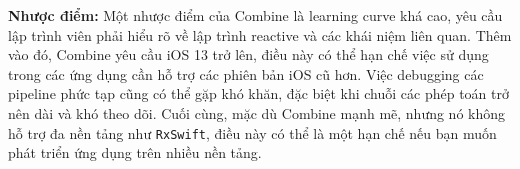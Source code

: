 \textbf{Nhược điểm:} Một nhược điểm của Combine là learning curve khá cao, yêu cầu lập trình viên phải hiểu rõ về lập trình reactive và các khái niệm liên quan. Thêm vào đó, Combine yêu cầu iOS 13 trở lên, điều này có thể hạn chế việc sử dụng trong các ứng dụng cần hỗ trợ các phiên bản iOS cũ hơn. Việc debugging các pipeline phức tạp cũng có thể gặp khó khăn, đặc biệt khi chuỗi các phép toán trở nên dài và khó theo dõi. Cuối cùng, mặc dù Combine mạnh mẽ, nhưng nó không hỗ trợ đa nền tảng như \texttt{RxSwift}, điều này có thể là một hạn chế nếu bạn muốn phát triển ứng dụng trên nhiều nền tảng.